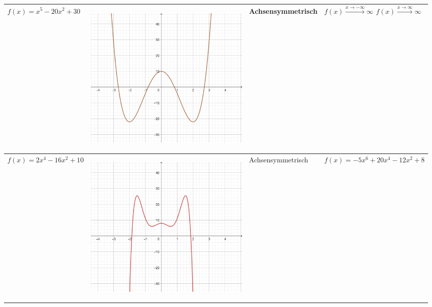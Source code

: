 \documentclass[oneside,openany,headings=optiontotoc,11pt,numbers=noenddot]{scrreprt}
\begin{document}
\begin{table}
\begin{tabular}{|M{4.35cm}|M{4.35cm}||M{4.35cm}|M{4.35cm}|}
			\hline
			 \(f(x)=x^5 - 20x^2 + 30\)  & \begin{center}\includegraphics[scale=0.15]{04-GanzrationaleFunktionen/g1.jpg}\end{center} & Achsensymmetrisch & \\
			\hline
			\(f(x)=2x^4-16x^2+10\)  & \begin{center}\includegraphics[scale=0.15]{04-GanzrationaleFunktionen/h1.jpg}\end{center} & Achsensymmetrisch & \(f(x) = -5x^6+20x^4-12x^2+8\) \\
			\hline
		\end{tabular}
	\end{table}
\end{document}
